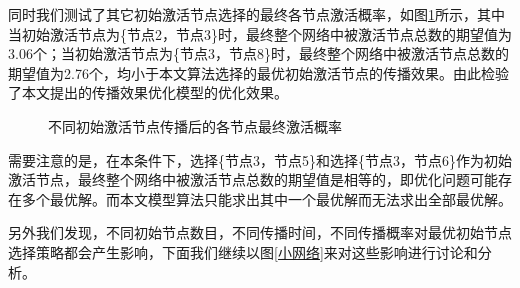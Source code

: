 \documentclass[UTF8]{ctexart}
\begin{document}
同时我们测试了其它初始激活节点选择的最终各节点激活概率，如图\ref{不同初始激活节点传播后的各节点最终激活概率}所示，其中当初始激活节点为\{节点2，节点3\}时，最终整个网络中被激活节点总数的期望值为3.06个；当初始激活节点为\{节点3，节点8\}时，最终整个网络中被激活节点总数的期望值为2.76个，均小于本文算法选择的最优初始激活节点的传播效果。由此检验了本文提出的传播效果优化模型的优化效果。

\begin{figure}[h!]
	\centering
	\hspace{0.3in} 
	\hspace{0.3in} 
	\caption{不同初始激活节点传播后的各节点最终激活概率}
	\label{不同初始激活节点传播后的各节点最终激活概率} %
\end{figure}

需要注意的是，在本条件下，选择\{节点3，节点5\}和选择\{节点3，节点6\}作为初始激活节点，最终整个网络中被激活节点总数的期望值是相等的，即优化问题可能存在多个最优解。而本文模型算法只能求出其中一个最优解而无法求出全部最优解。

另外我们发现，不同初始节点数目，不同传播时间，不同传播概率对最优初始节点选择策略都会产生影响，下面我们继续以图\ref{小网络}来对这些影响进行讨论和分析。
\end{document}
